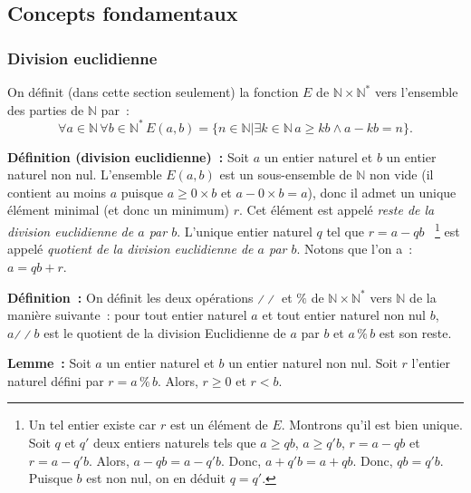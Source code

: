\subsection{Concepts fondamentaux}

\subsubsection{Division euclidienne}

On définit (dans cette section seulement) la fonction $E$ de $\mathbb{N} \times \mathbb{N}^*$ vers l'ensemble des parties de $\mathbb{N}$ par : 
\begin{equation*}
    \forall a \in \mathbb{N} \, 
    \forall b \in \mathbb{N}^* \, 
    E(a,b) = \lbrace
        n \in \mathbb{N} 
        \vert
        \exists k \in \mathbb{N} \,  
        a \geq k b \wedge a - k b = n
    \rbrace .
\end{equation*}

\medskip

\noindent\textbf{Définition (division euclidienne) :}
Soit $a$ un entier naturel et $b$ un entier naturel non nul.
L'ensemble $E(a,b)$ est un sous-ensemble de $\mathbb{N}$ non vide (il contient au moins $a$ puisque $a \geq 0 \times b$ et $a - 0 \times b = a$), donc il admet un unique élément minimal (et donc un minimum) $r$. 
Cet élément est appelé \textit{reste de la division euclidienne de $a$ par $b$}. 
L'unique entier naturel $q$ tel que $r = a - q b$%
~\footnote{Un tel entier existe car $r$ est un élément de $E$. 
    Montrons qu'il est bien unique. 
    Soit $q$ et $q'$ deux entiers naturels tels que $a \geq q b$, $a \geq q' b$, $r = a - q b$ et $r = a - q' b$.
    Alors, $a - q b = a - q' b$.
    Donc, $a + q' b = a + q b$.
    Donc, $q b = q' b$.
    Puisque $b$ est non nul, on en déduit $q = q'$.
}  
est appelé \textit{quotient de la division euclidienne de $a$ par $b$}. 
Notons que l'on a : $a = q b + r$. 

\medskip

\noindent\textbf{Définition :} On définit les deux opérations $\divslash\!\divslash$ et $\%$ de $\mathbb{N} \times \mathbb{N}^*$ vers $\mathbb{N}$ de la manière suivante : pour tout entier naturel $a$ et tout entier naturel non nul $b$, $a \mathrel{\divslash\!\divslash} b$ est le quotient de la division Euclidienne de $a$ par $b$ et $a \mathrel{\%} b$ est son reste. 

\medskip

\noindent\textbf{Lemme :} Soit $a$ un entier naturel et $b$ un entier naturel non nul.
    Soit $r$ l'entier naturel défini par $r = a \mathrel{\%} b$.
    Alors, $r \geq 0$ et $r < b$.


